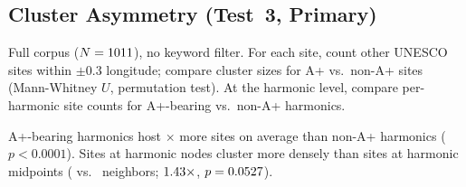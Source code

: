 \documentclass[HARVARD,twocolumn]{USG}
\begin{document}
\subsection{Cluster Asymmetry (Test~3, Primary)}
\label{sec:resultscluster}

Full corpus ($N = \NclusterTotal$), no keyword filter.
For each site, count other UNESCO sites within $\pm 0.3$\textdegree{}
longitude; compare cluster sizes for A+ vs.\ non-A+ sites (Mann-Whitney $U$,
permutation test). At the harmonic level, compare per-harmonic site counts
for A+-bearing vs.\ non-A+ harmonics.

\begin{table}[!t]
\centering
\caption{Cluster asymmetry: A+ vs.\ non-A+ sites in the full UNESCO corpus
  ($N = \NclusterTotal$; cluster radius $\pm 0.3$\textdegree{} lon)}
\label{tab:clusterasym}
\small
{}%
\end{table}

\noindent A+-bearing harmonics host \clusterHarmonicRatio$\times$ more sites
on average than non-A+ harmonics ($p < 0.0001$).
Sites at harmonic nodes cluster more densely than sites at harmonic midpoints
(\clusterNodeApMean{} vs.\ \clusterAntiApMean{} neighbors;
$1.43\times$, $p = 0.0527$).
\end{document}
